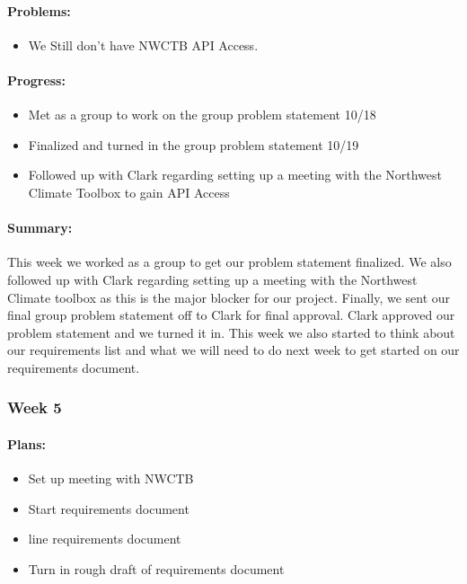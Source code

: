 \documentclass[onecolumn, draftclsnofoot,10pt, compsoc]{article}
\begin{document}
		    \paragraph{Problems:} \hfill \break
		        
		        \begin{itemize}
		            \item We Still don't have NWCTB API Access.
		        \end{itemize}
		        
		    \paragraph{Progress:} \hfill \break
		    
		        \begin{itemize}
		            \item Met as a group to work on the group problem statement 10/18
		            \item Finalized and turned in the group problem statement 10/19
		            \item Followed up with Clark regarding setting up a meeting with the Northwest Climate Toolbox to gain API Access
		        \end{itemize}
		        
		        \paragraph{Summary:}
		            This week we worked as a group to get our problem statement finalized. We also followed up with Clark regarding setting up a meeting with the Northwest Climate toolbox as this is the major blocker for our project. Finally, we sent our final group problem statement off to Clark for final approval. Clark approved our problem statement and we turned it in. This week we also started to think about our requirements list and what we will need to do next week to get started on our requirements document.\\
		    
		\subsubsection{Week 5}
			\paragraph{Plans:} \hfill \break
		        
		        \begin{itemize}
		            \item Set up meeting with NWCTB
		            \item Start requirements document
		            \item line requirements document
		            \item Turn in rough draft of requirements document
		        \end{itemize}
		        
\end{document}

